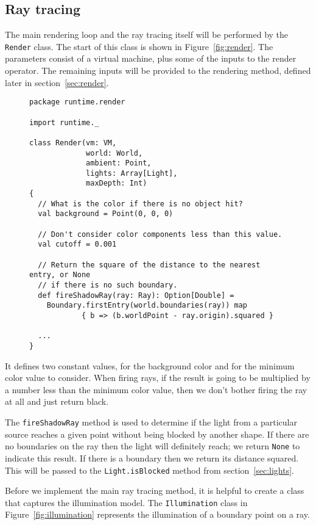 \subsection{Ray tracing\label{sec:raytracing}}

The main rendering loop and the ray tracing itself will be
performed by the \verb!Render! class.
The start of this class is shown in Figure~\ref{fig:render}.
The parameters consist of a virtual machine,
plus some of the inputs to the render operator.
The remaining inputs will be provided to the rendering method,
defined later in section~\ref{sec:render}.

\begin{figure}
\begin{verbatim}
package runtime.render

import runtime._

class Render(vm: VM,
             world: World,
             ambient: Point,
             lights: Array[Light],
             maxDepth: Int)
{
  // What is the color if there is no object hit?
  val background = Point(0, 0, 0)

  // Don't consider color components less than this value.
  val cutoff = 0.001

  // Return the square of the distance to the nearest entry, or None
  // if there is no such boundary.
  def fireShadowRay(ray: Ray): Option[Double] =
    Boundary.firstEntry(world.boundaries(ray)) map
            { b => (b.worldPoint - ray.origin).squared }

  ...
}
\end{verbatim}
\getcaption
\end{figure}

It defines two constant values,
for the background color and for the minimum color value to consider.
When firing rays,
if the result is going to be multiplied by a number less than
the minimum color value,
then we don't bother firing the ray at all and just return black.

The \verb!fireShadowRay! method is used to determine if the light
from a particular source reaches a given point
without being blocked by another shape.
If there are no boundaries on the ray then the light will definitely reach;
we return \verb!None! to indicate this result.
If there is a boundary then we return its distance squared.
This will be passed to the \verb!Light.isBlocked! method
from section~\ref{sec:lights}.

Before we implement the main ray tracing method,
it is helpful to create a class that captures the illumination model.
The \verb!Illumination! class in Figure~\ref{fig:illumination}
represents the illumination of a boundary point on a ray.

